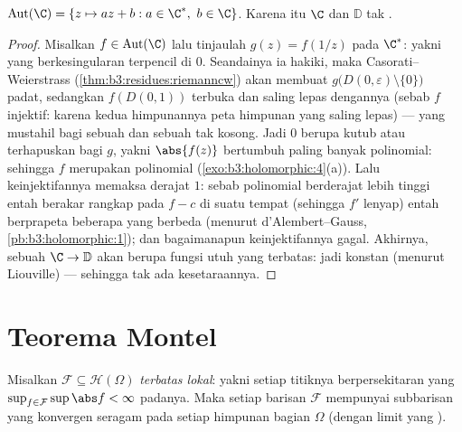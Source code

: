 \begin{theorem}
\label{thm:b3:conformal:autplane}
$\operatorname{Aut}(\C) = \{z \mapsto az + b : a \in \C^*,\ b
\in \C\}$. Karena itu $\C$ dan $\mathbb D$ tak
.
\end{theorem}

\begin{proof}
Misalkan $f \in \operatorname{Aut}(\C)$ lalu tinjaulah $g(z) =
f(1/z)$ pada $\C^*$: yakni  yang berkesingularan
terpencil di $0$. Seandainya ia hakiki, maka
Casorati--Weierstrass (\cref{thm:b3:residues:riemanncw}) akan
membuat $g\bigl(D(0,\varepsilon)\setminus\{0\}\bigr)$ padat,
sedangkan $f(D(0, 1))$ terbuka dan saling lepas dengannya (sebab $f$
injektif: karena kedua himpunannya peta himpunan yang saling lepas) ---
yang mustahil bagi sebuah  dan sebuah  tak kosong. Jadi $0$
berupa kutub atau terhapuskan bagi $g$, yakni $\abs{f(z)}$ bertumbuh paling banyak
polinomial: sehingga $f$ merupakan polinomial
(\cref{exo:b3:holomorphic:4}(a)). Lalu keinjektifannya memaksa derajat
$1$: sebab polinomial berderajat lebih tinggi entah berakar rangkap pada
$f - c$ di suatu tempat (sehingga $f'$ lenyap) entah berprapeta beberapa
yang berbeda (menurut d'Alembert--Gauss, \cref{pb:b3:holomorphic:1});
dan bagaimanapun keinjektifannya gagal. Akhirnya, sebuah  $\C \to
\mathbb D$ akan berupa fungsi utuh yang terbatas: jadi konstan
(menurut Liouville) --- sehingga tak ada kesetaraannya.
\end{proof}

\section{Teorema Montel}

\begin{theorem}[Montel]\label{thm:b3:conformal:montel}
Misalkan $\mathcal F \subseteq \mathcal H(\Omega)$ \emph{terbatas
lokal}: yakni setiap titiknya berpersekitaran yang $\sup_{f\in
\mathcal F}\sup\abs f < \infty$ padanya. Maka setiap barisan
$\mathcal F$ mempunyai subbarisan yang konvergen seragam pada setiap
himpunan bagian  $\Omega$ (dengan limit yang
).
\end{theorem}

